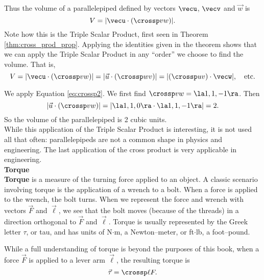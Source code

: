 Thus the volume of a parallelepiped defined by vectors $\vecu$, $\vecv$ and $\vec w$ is \begin{equation}V = |\vecu\cdot (\crossp vw)|.\label{eq:crossp2}\end{equation}
Note how this is the Triple Scalar Product, first seen in Theorem \ref{thm:cross_prod_prop}. Applying the identities given in the theorem shows that we can apply the Triple Scalar Product in any ``order'' we choose to find the volume. That is,
$$V = |\vecu\cdot(\crossp vw)| = |\vec u\cdot (\crossp wv)| = |(\crossp uv)\cdot \vecw|,\quad \text{etc.}$$

{We apply Equation \eqref{eq:crossp2}. We first find $\crossp vw =\la 1,1,-1\ra$. Then
$$|\vec u\cdot(\crossp vw)| = |\la 1,1,0\ra \cdot \la1,1,-1\ra| = 2.$$
So the volume of the parallelepiped is 2 cubic units.
}\\

While this application of the Triple Scalar Product is interesting, it is not used all that often: parallelepipeds are not a common shape in physics and engineering. The last application of the cross product is very applicable in engineering.\\

\noindent\textbf{Torque}\\

\textbf{Torque} is a measure of the turning force applied to an object. A classic scenario involving torque is the application of a wrench to a bolt. When a force is applied to the wrench, the bolt turns. When we represent the force and wrench with vectors $\vec F$ and $\vec \ell$, we see that the bolt moves (because of the threads) in a  direction orthogonal to $\vec F$ and $\vec \ell$. Torque is usually represented by the Greek letter $\tau$, or tau, and has units of N$\cdot$m, a Newton--meter, or ft$\cdot$lb, a foot--pound.

While a full understanding of torque is beyond the purposes of this book, when a force $\vec F$ is applied to a lever arm $\vec \ell$, the resulting torque is \begin{equation}\vec \tau = \crossp \ell F.\label{eq:crossp3}\end{equation}

